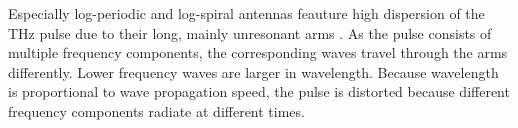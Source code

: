 Especially log-periodic and log-spiral antennas feauture high dispersion of the THz pulse due to their long, mainly unresonant arms \cite{fernandezolveraDispersivePropertiesSelfcomplementary2017a}. As the pulse consists of multiple frequency components, the corresponding waves travel through the arms differently. Lower frequency waves are larger in wavelength. Because wavelength is proportional to wave propagation speed, the pulse is distorted because different frequency components radiate at different times. 



